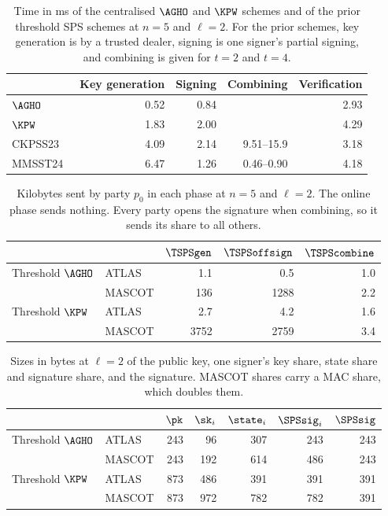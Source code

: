 \begin{table}[htbp] \centering \small \begin{tabular}{l r r r r}
\toprule
 & Key generation & Signing & Combining & Verification \\
\midrule
$\AGHO$ & 0.52 & 0.84 & & 2.93 \\
$\KPW$ & 1.83 & 2.00 & & 4.29 \\
CKPSS23~\cite{AC:CKPSS23} & 4.09 & 2.14 & 9.51--15.9 & 3.18 \\
MMSST24~\cite{PKC:MMSST24} & 6.47 & 1.26 & 0.46--0.90 & 4.18 \\
\bottomrule
\end{tabular}
\caption[Centralised and prior threshold schemes: time]{Time in ms of the
centralised $\AGHO$ and $\KPW$ schemes and of the prior threshold SPS schemes at
$n = 5$ and $\ell = 2$. For the prior schemes, key generation is by a trusted
dealer, signing is one signer's partial signing, and combining is given for
$t = 2$ and $t = 4$.} \label{tab:tsps-baselines-time} \end{table}

\begin{table}[htbp] \centering \small \begin{tabular}{l l r r r}
\toprule
 & & $\TSPSgen$ & $\TSPSoffsign$ & $\TSPScombine$ \\
\midrule
Threshold $\AGHO$ & ATLAS & 1.1 & 0.5 & 1.0 \\
 & MASCOT & 136 & 1288 & 2.2 \\
Threshold $\KPW$ & ATLAS & 2.7 & 4.2 & 1.6 \\
 & MASCOT & 3752 & 2759 & 3.4 \\
\bottomrule
\end{tabular}
\caption[Threshold SPS schemes: communication]{Kilobytes sent by party $p_0$ in
each phase at $n = 5$ and $\ell = 2$. The online phase sends nothing. Every party
opens the signature when combining, so it sends its share to all others.}
\label{tab:tsps-comms} \end{table}

\begin{table}[htbp] \centering \small \begin{tabular}{l l r r r r r}
\toprule
 & & $\pk$ & $\sk_i$ & $\state_i$ & $\SPSsig_i$ & $\SPSsig$ \\
\midrule
Threshold $\AGHO$ & ATLAS & 243 & 96 & 307 & 243 & 243 \\
 & MASCOT & 243 & 192 & 614 & 486 & 243 \\
Threshold $\KPW$ & ATLAS & 873 & 486 & 391 & 391 & 391 \\
 & MASCOT & 873 & 972 & 782 & 782 & 391 \\
\bottomrule
\end{tabular}
\caption[Threshold SPS schemes: sizes]{Sizes in bytes at $\ell = 2$ of the public
key, one signer's key share, state share and signature share, and the signature.
MASCOT shares carry a MAC share, which doubles them.} \label{tab:tsps-sizes}
\end{table}

